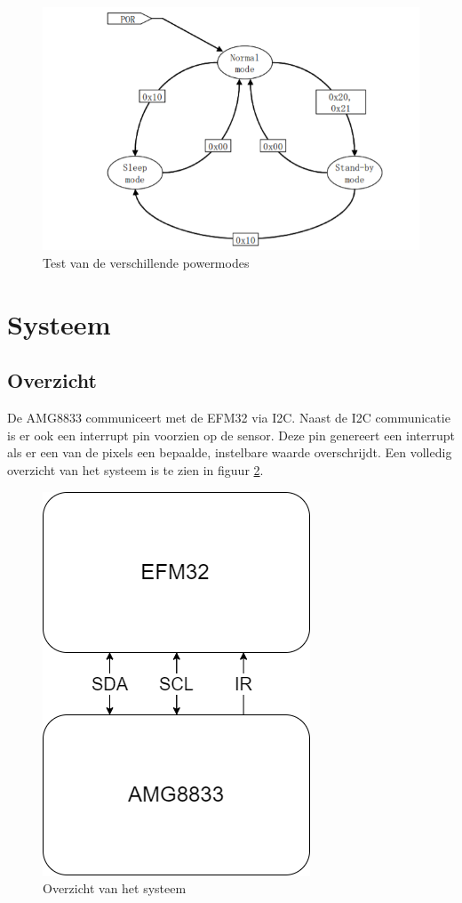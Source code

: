 \documentclass[]{article}
\begin{document}

\begin{figure}[!ht]
	\centering
	\includegraphics[width=\columnwidth]{operatingmodes.png}
	\caption{Test van de verschillende powermodes}
	\label{fig:powertest}
\end{figure}

\section{Systeem}
\subsection{Overzicht}
De AMG8833 communiceert met de EFM32 via I2C. Naast de I2C communicatie is er ook een interrupt pin voorzien op de sensor. Deze pin genereert een interrupt als er een van de pixels een bepaalde, instelbare waarde overschrijdt. Een volledig overzicht van het systeem is te zien in figuur \ref{fig:systeem}.

\begin{figure}[!ht]
	\centering
	\includegraphics[scale=0.5]{sys.png}
	\caption{Overzicht van het systeem}
	\label{fig:systeem}
\end{figure}
\end{document}
